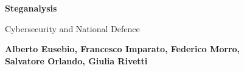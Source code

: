 \documentclass{article}
\begin{document}
    \begin{center}
        \Large
        \textbf{Steganalysis}
            
        \vspace{0.4cm}
        \large
        Cybersecurity and National Defence
            
        \vspace{0.4cm}
        \textbf{Alberto Eusebio, Francesco Imparato, Federico Morro,\\
        Salvatore Orlando, Giulia Rivetti}
        
        \vspace{0.6cm}
    \end{center}

    
    \tableofcontents

    \pagebreak
    
    \begin{small}
        
        
        
        
    \end{small}

    \pagebreak

    \printbibliography
\end{document}
